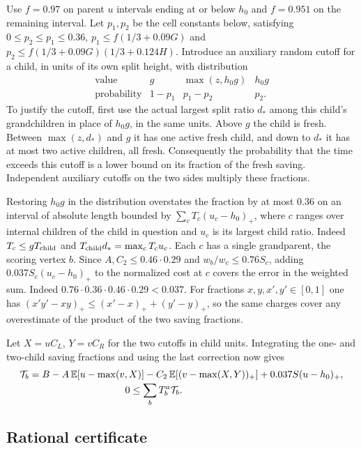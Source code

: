 \documentclass[11pt]{article}
\numberwithin{equation}{section}
\newcommand{\EE}{\mathbb E}
\begin{document}
Use $f=0.97$ on parent $u$ intervals ending at or below $h_0$
and $f=0.951$ on the remaining interval. Let $p_1,p_2$ be the
cell constants below, satisfying $0\le p_2\le p_1\le0.36$,
$p_1\le f(1/3+0.09G)$ and
$p_2\le f(1/3+0.09G)(1/3+0.124H)$. Introduce an auxiliary
random cutoff for a child, in units of its own split height,
with distribution
\[
 \begin{array}{c|ccc}
 \text{value}&g&\max(z,h_0g)&h_0g\\
 \text{probability}&1-p_1&p_1-p_2&p_2 .
 \end{array}
\]
To justify the cutoff, first use the actual largest split ratio
$d_*$ among this child's grandchildren in place of $h_0g$, in
the same units. Above $g$ the child is fresh. Between
$\max(z,d_*)$ and $g$ it has one active fresh child, and down to
$d_*$ it has at most two active children, all fresh. Consequently
the probability that the time exceeds this cutoff is a lower
bound on its fraction of the fresh saving. Independent auxiliary
cutoffs on the two sides multiply these fractions.

Restoring $h_0g$ in the distribution overstates the fraction by
at most $0.36$ on an interval of absolute length bounded by
$\sum_c T_c(u_c-h_0)_+$, where $c$ ranges over internal children
of the child in question and $u_c$ is its largest child ratio.
Indeed $T_c\le gT_{\rm child}$ and $T_{\rm child}d_*=
\max_c T_cu_c$. Each $c$ has a single grandparent, the scoring
vertex $b$. Since $A,C_2\le0.46\cdot0.29$ and
$w_b/w_c\le0.76 S_c$, adding $0.037 S_c(u_c-h_0)_+$ to
the normalized cost at $c$ covers the error in the weighted sum.
Indeed $0.76\cdot0.36\cdot0.46\cdot0.29<0.037$. For fractions
$x,y,x',y'\in[0,1]$ one has
$(x'y'-xy)_+\le(x'-x)_++(y'-y)_+$, so the same charges cover
any overestimate of the product of the two saving fractions.

Let $X=uC_L$, $Y=vC_R$ for the two cutoffs in child units.
Integrating the one- and two-child saving fractions and using the
last correction now gives
\begin{align}
 \mathcal T_b={}& B-A\,\EE[u-\max(v,X)]
       -C_2\,\EE[(v-\max(X,Y))_+]+0.037S(u-h_0)_+,
     \notag\\[-2pt]
 &\hspace{30mm}0\le\sum_b T_b^a\mathcal T_b .                  \label{nu:toll}
\end{align}

\subsection{Rational certificate}
\end{document}
